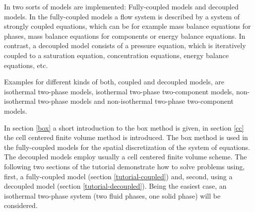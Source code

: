 In \Dumux two sorts of models are implemented: Fully-coupled models and
decoupled models. In the fully-coupled models a flow system is described by a
system of strongly coupled equations, which can be for example mass balance
equations for phases, mass balance equations for components or energy balance
equations. In contrast, a decoupled model consists of a pressure equation, which
is iteratively coupled to a saturation equation, concentration equations, energy
balance equations, etc.

Examples for different kinds of both, coupled and decoupled models, are
isothermal two-phase models, isothermal two-phase two-component models,
non-isothermal two-phase models and non-isothermal two-phase two-component
models.

In section \ref{box} a short introduction to the box method is given, in section
\ref{cc} the cell centered finite volume method is introduced. The box method is
used in the fully-coupled models for the spatial discretization of the system of
equations. The decoupled models employ usually a cell centered finite volume
scheme. The following two sections of the tutorial demonstrate how to solve
problems using, first, a fully-coupled model (section \ref{tutorial-coupled})
and, second, using a decoupled model (section \ref{tutorial-decoupled}). Being
the easiest case, an isothermal two-phase system (two fluid phases, one solid
phase) will be considered.

